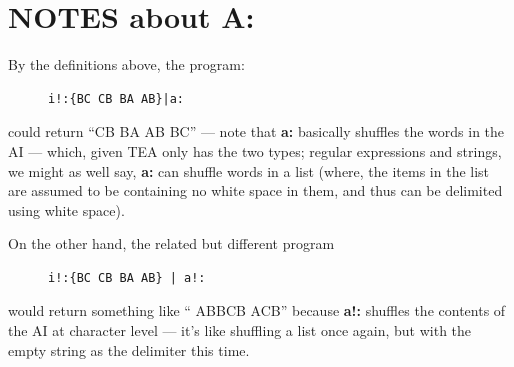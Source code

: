 \documentclass[a4paper, 18pt]{book} %
\begin{document}
\section{NOTES about A:}
\label{SECNOTESA}

By the definitions above, the program:



 \begin{figure}[H]
 \Large
  \centering
  \begin{tcolorbox}[teaterminalstyle, title=TEA Program: shuffling words in a string]
  \begin{lstlisting}[language=TEA]
i!:{BC CB BA AB}|a:
   \end{lstlisting}
  \end{tcolorbox}
\end{figure}


could return “CB BA AB BC” --- note that \textbf{a:} basically shuffles the words in the AI --- which, given TEA only has the two types; regular expressions and strings, we might as well say, \textbf{a:} can shuffle words in a list (where, the items in the list are assumed to be containing no white space in them, and thus can be delimited using white space). 

On the other hand, the related but different program


 \begin{figure}[H]
 \Large
  \centering
  \begin{tcolorbox}[teaterminalstyle, title=TEA Program: shuffling a list of symbols]
  \begin{lstlisting}[language=TEA]
i!:{BC CB BA AB} | a!:
   \end{lstlisting}
  \end{tcolorbox}
\end{figure}

would return something like “  ABBCB ACB” because \textbf{a!:} shuffles the contents of the AI at character level --- it's like shuffling a list once again, but with the empty string as the delimiter this time.
\end{document}

